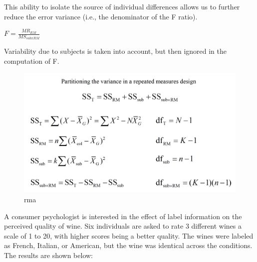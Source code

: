 \documentclass[]{book}
\theoremstyle{definition}
\theoremstyle{definition}
\theoremstyle{definition}
\theoremstyle{remark}
\begin{document}
This ability to isolate the source of individual differences allows us
to further reduce the error variance (i.e., the denominator of the F
ratio).

\(F = \frac{MR_{RM}}{MS_{sub x RM}}\)

Variability due to subjects is taken into account, but then ignored in
the computation of F.

\begin{figure}
\centering
\includegraphics{img/hicksrma4.png}
\caption{rma}
\end{figure}

A consumer psychologist is interested in the effect of label information
on the perceived quality of wine. Six individuals are asked to rate 3
different wines a scale of 1 to 20, with higher scores being a better
quality. The wines were labeled as French, Italian, or American, but the
wine was identical across the conditions. The results are shown below:
\end{document}
